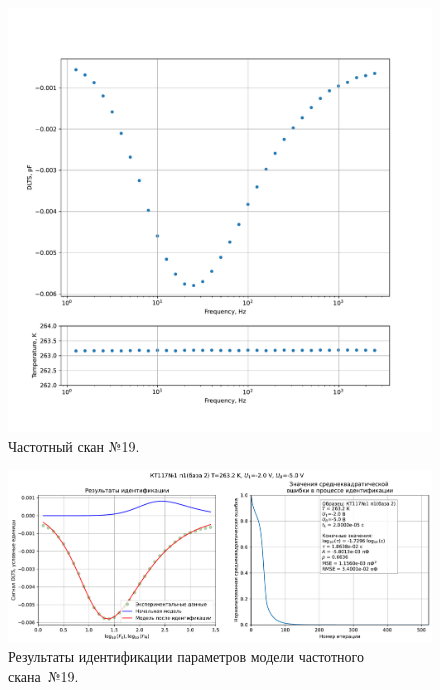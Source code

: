 \begin{figure}[!ht]
    \centering
    \includegraphics[width=1\textwidth]{../plots/КТ117№1_п1(база 2)_2500Гц-1Гц_1пФ_-10С_-2В-5В_100мВ_20мкс_шаг_0,1.pdf}
    \caption{Частотный скан №19.}
    \label{pic:frequency_scan_19}
\end{figure}

\begin{figure}[!ht]
    \centering
    \includegraphics[width=1\textwidth]{../plots/КТ117№1_п1(база 2)_2500Гц-1Гц_1пФ_-10С_-2В-5В_100мВ_20мкс_шаг_0,1_model.pdf}
    \caption{Результаты идентификации параметров модели частотного скана~№19.}
    \label{pic:frequency_scan_model19}
\end{figure}

\pagebreak


